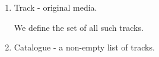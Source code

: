 \documentclass[11pt]{article}
\begin{document}
\begin{enumerate}

\item \textsf{Track} - original media.

We define the set of all such tracks.

\begin{flushright}
  \begin{tikzpicture}
    
  \end{tikzpicture}
\end{flushright}

\begin{zed}
[Track]  
\end{zed}










\item \textsf{Catalogue} - a non-empty list of tracks.


\begin{flushright}
\end{flushright}


\end{enumerate}
\end{document}
